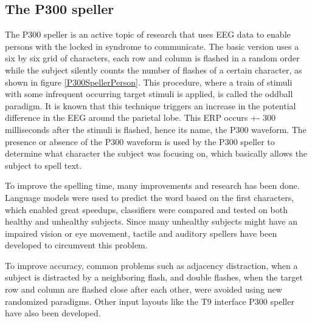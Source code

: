 
\subsection{The P300 speller}

The P300 speller is an active topic of research that uses EEG data to enable persons with the locked in syndrome to communicate\cite{P300Origin}. The basic version uses a six by six grid of characters, each row and column is flashed in a random order while the subject silently counts the number of flashes of a certain character, as shown in figure \ref{P300SpellerPerson}. This procedure, where a train of stimuli with some infrequent occurring target stimuli is applied, is called the oddball paradigm\cite{PaperThibault}. It is known that this technique triggers an increase in the potential difference in the EEG around the parietal lobe. This ERP occurs +- 300 milliseconds after the stimuli is flashed, hence its name, the P300 waveform\cite{ComparisonClassifications}. The presence or absence of the P300 waveform is used by the P300 speller to determine what character the subject was focusing on, which basically allows the subject to spell text. 


To improve the spelling time, many improvements and research has been done. Language models were used to predict the word based on the first characters, which enabled great speedups\cite{LangModel}, classifiers were compared and tested on both healthy\cite{ClassTechniqueComp} and unhealthy subjects\cite{ComparisonClassifications}. Since many unhealthy subjects might have an impaired vision or eye movement, tactile\cite{TactileP300} and auditory\cite{AuditoryP300} spellers have been developed to circumvent this problem.

\npar

To improve accuracy, common problems such as adjacency distraction, when a subject is distracted by a neighboring flash, and double flashes, when the target row and column are flashed close after each other, were avoided using new randomized paradigms\cite{PaperThibault}. Other input layouts like the T9 interface P300 speller have also been developed\cite{P300T9}. 

\npar

